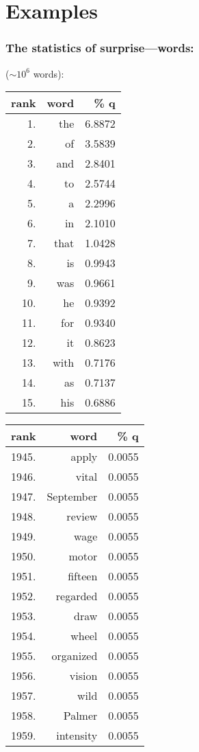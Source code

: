 \section{Examples}

\begin{frame}
\frametitle{The statistics of surprise---words:}

\begin{block}{ ($\sim 10^6$ words):}
  \begin{tabular}{|rrr|}
    \hline
    rank & word & \% q \\
    \hline
    1. &     the   &    6.8872 \\
    2. &     of    &    3.5839 \\
    3. &     and   &    2.8401 \\
    4. &     to    &    2.5744 \\
    5. &     a     &    2.2996 \\
    6. &     in    &    2.1010 \\
    7. &     that  &    1.0428 \\
    8. &     is    &    0.9943 \\
    9. &     was   &    0.9661 \\
    10.&     he    &    0.9392 \\
    11.&     for   &    0.9340 \\
    12.&     it    &    0.8623 \\
    13.&     with  &    0.7176 \\
    14.&     as    &    0.7137 \\
    15.&     his   &    0.6886 \\
    \hline
  \end{tabular}\quad\begin{tabular}{|rrr|}
    \hline
    rank & word & \% q \\
    \hline
    1945. &  apply   &      0.0055 \\
    1946. &  vital   &      0.0055 \\
    1947. &  September&      0.0055 \\
    1948. &  review  &      0.0055 \\
    1949. &  wage    &      0.0055 \\
    1950. &  motor   &      0.0055 \\
    1951. &  fifteen &      0.0055 \\
    1952. &  regarded&      0.0055 \\
    1953. &  draw    &      0.0055 \\
    1954. &  wheel   &      0.0055 \\
    1955. &  organized&      0.0055 \\
    1956. &  vision  &      0.0055 \\
    1957. &  wild    &      0.0055 \\
    1958. &  Palmer  &      0.0055 \\
    1959. &  intensity&      0.0055 \\
    \hline
  \end{tabular}
\end{block}


\end{frame}
